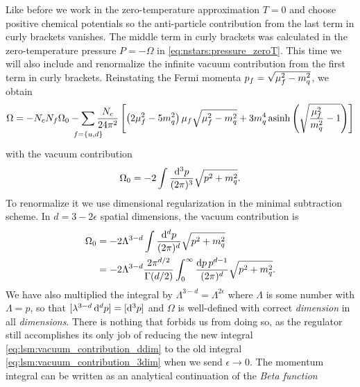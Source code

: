 Like before we work in the zero-temperature approximation $T=0$ and choose positive chemical potentials so the anti-particle contribution from the last term in curly brackets vanishes.
The middle term in curly brackets was calculated in the zero-temperature pressure $P=-\Omega$ in \eqref{eq:nstars:pressure_zeroT}.
This time we will also include and renormalize the infinite vacuum contribution from the first term in curly brackets.
Reinstating the Fermi momenta $p_f = \sqrt{\smash[b]{\mu_f^2-m_q^2}}$, we obtain
\begin{equation}
	\Omega = -N_c N_f \Omega_0 - \smashoperator{\sum_{\vphantom{\big|} f=\{u,d\}}} \frac{N_c}{24 \pi^2} \left[ \left( 2 \mu_f^2 - 5 m_q^2 \right) \mu_f \sqrt{\mu_f^2 - m_q^2} + 3 m_q^4 \asinh \left( \sqrt{\frac{\mu_{\smash{f}}^2}{m_q^2}-1} \right) \right]
\end{equation}
with the vacuum contribution
\begin{equation}
	\Omega_0 = -2 \int \frac{\mathop{}\!\mathrm{d}^3 p}{(2 \pi)^3} \sqrt{p^2 + m_q^2}.
\label{eq:lsm:vacuum_contribution_3dim}
\end{equation}
To renormalize it we use dimensional regularization in the minimal subtraction scheme.
In $d = 3 - 2 \epsilon$ spatial dimensions, the vacuum contribution is
\begin{equation}
\begin{split}
	\Omega_0 &= -2 \Lambda^{3-d} \int \frac{\mathop{}\!\mathrm{d}^d p}{(2 \pi)^d} \sqrt{p^2 + m_q^2} \\
	         &= -2 \Lambda^{3-d} \frac{2 \pi^{d/2}}{\Gamma(d/2)} \int_0^\infty \frac{\mathop{}\!\mathrm{d} p \, p^{d-1}}{(2 \pi)^d} \sqrt{p^2 + m_q^2} .
\end{split}
\label{eq:lsm:vacuum_contribution_ddim}
\end{equation}
We have also multiplied the integral by $\Lambda^{3-d} = \Lambda^{2\epsilon}$ where $\Lambda$ is some number with $\unit{\Lambda} = \unit{p}$,
so that $[\lambda^{3-d} \mathop{}\!\mathrm{d}^d p] = [\mathop{}\!\mathrm{d}^3 p]$ and $\Omega$ is well-defined with correct \emph{dimension} in all \emph{dimensions}.
There is nothing that forbids us from doing so,
as the regulator still accomplishes its only job of reducing the new integral \eqref{eq:lsm:vacuum_contribution_ddim} to the old integral \eqref{eq:lsm:vacuum_contribution_3dim} when we send $\epsilon \rightarrow 0$.
The momentum integral can be written as an analytical continuation of the \emph{Beta function} \cite{ref:beta_function}
